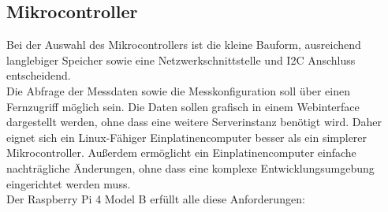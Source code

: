 \subsection{Mikrocontroller}\label{Mikrocontroller}
Bei der Auswahl des Mikrocontrollers ist die kleine Bauform, ausreichend langlebiger Speicher sowie eine Netzwerkschnittstelle und I2C Anschluss entscheidend.\\
Die Abfrage der Messdaten sowie die Messkonfiguration soll über einen Fernzugriff möglich sein. Die Daten sollen grafisch in einem Webinterface dargestellt werden, ohne dass eine weitere Serverinstanz benötigt wird. Daher eignet sich ein Linux-Fähiger Einplatinencomputer besser als ein simplerer Mikrocontroller.
Außerdem ermöglicht ein Einplatinencomputer einfache nachträgliche Änderungen, ohne dass eine komplexe Entwicklungsumgebung eingerichtet werden muss.\\

Der Raspberry Pi 4 Model B erfüllt alle diese Anforderungen:

